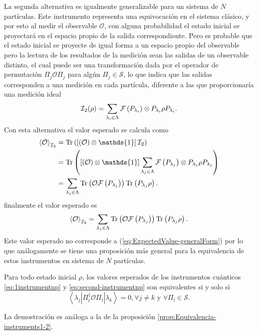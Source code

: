 La segunda alternativa es igualmente generalizable para un sistema de $N$
partículas. Este instrumento representa una equivocación en el sistema clásico,
y por esto al medir el observable $\mathcal{O}$, con alguna probabilidad el
estado inicial se proyectará en el espacio propio de la salida correspondiente.
Pero es probable que el estado inicial se proyecte de igual forma a un espacio
propio del observable pero la lectura de los resultados de la medición sean las
salidas de un observable distinto, el cual puede ser una transformación dada
por el operador de permutación $\Pi_j\mathcal{O}\Pi_j$ para algún $\Pi_j\in
\mathcal{S}$, lo que indica que las salidas corresponden a una medición en cada
partícula, diferente a las que proporcionaría una medición ideal
\begin{equation}\label{eq:second-instrumentnp}
    \mathcal{I}_2(\rho)= \sum_{\lambda_i \in \Lambda } \mathcal{F}\left(P_{\lambda_i}\right)\otimes P_{\lambda_i}\rho P_{\lambda_i}.
\end{equation} 
Con esta alternativa el valor esperado se calcula como 
\begin{equation*}
    \begin{split}
        \left \la \mathcal{O} \right \ra_{\mathcal{I}_2}&=\tr\left( \left[\left(\mathcal{O}\right) \otimes \mathds{1}\right]\mathcal{I}_2\right) \\
        &=\tr\left(\left[ \left(\mathcal{O}\right)\otimes \mathds{1}\right]\sum_{\lambda_j \in \Lambda}\fuzzy{P_{\lambda_j}}\otimes P_{\lambda_j}{\rho}P_{\lambda_j} \right)\\
        &=\sum_{\lambda_j\in \Lambda} \tr\left(\mathcal{O}\fuzzy{P_{\lambda_j}}\right) \tr\left(P_{\lambda_j}\rho\right). \\
    \end{split}
\end{equation*} 
finalmente el valor esperado es \begin{equation}\label{eq:valor-esperado-2instrumentnp}
    \left \langle \mathcal{O}\right \rangle_{\mathcal{I}_2}=\sum_{\lambda_j\in \Lambda} {\rm Tr}\left(\mathcal{O}\mathcal{F}\left(P_{\lambda_j}\right)\right) {\rm Tr}\left(P_{\lambda_j}\rho\right).
\end{equation} 
Este valor esperado no corresponde a (\ref{eq:ExpectedValue-generalForm}) por
lo que análogamente se tiene una proposición más general para la equivalencia
de estos instrumentos en sistema de $N$ partículas.

\begin{proposition}\label{prop:Equivalencia-instrumentos-np}
    Para todo estado inicial $\rho$, los valores esperados de los instrumentos
cuánticos {\ref{eq:1instrumentnp}} y {\ref{eq:second-instrumentnp}} son
equivalentes si y solo si \[\left \langle \lambda_j \left|\Pi_l^\dagger
\mathcal{O} \Pi_l\right|\lambda_k\right\rangle=0,\forall j\ne k \text{ y }
\forall \Pi_l \in \mathcal{S}.\]
\end{proposition} 
La demostración es análoga a la de la proposición {\ref{prop:Equivalencia-instruments1-2}}.




